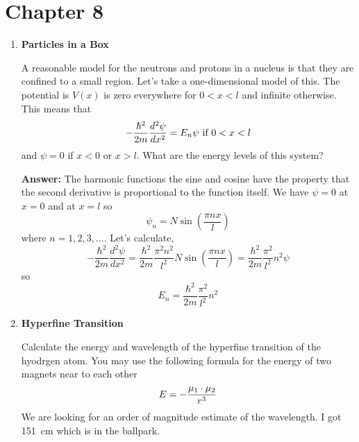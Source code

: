 \documentclass{article}
\newcommand{\rmmat}[1]{\hbox{\rm #1}}
\begin{document}
\fi

\section{Chapter 8}
\begin{enumerate}
\item{\bf Particles in a Box}

A reasonable model for the neutrons and protons in a nucleus is that
they are confined to a small region.   Let's take a one-dimensional
model of this.  The potential is $V(x)$ is zero everywhere for $0<x<l$
and infinite otherwise.  This means that 
\begin{equation}
-\frac{\hbar^2}{2m} \frac{d^2 \psi}{d x^2} = E_n \psi ~\rmmat{if}~0<x<l
\end{equation}
and $\psi=0$ if $x<0$ or $x>l$.  
What are the energy levels of this system?


{\bf Answer:}
The harmonic functions the sine and cosine have the property that the
second derivative is proportional to the function itself.  We have
$\psi=0$ at $x=0$ and at $x=l$ so 
\begin{equation}
\psi_n = N \sin \left ( \frac{\pi n x}{l} \right )
\end{equation}
where $n=1,2,3,\ldots$.  Let's calculate,
\begin{equation}
-\frac{\hbar^2}{2m} \frac{d^2 \psi}{dx^2} = \frac{\hbar^2}{2m}
\frac{\pi^2 n^2}{l^2} N \sin \left ( \frac{\pi n x}{l} \right ) = \frac{\hbar^2}{2m}
\frac{\pi^2}{l^2} n^2 \psi
\end{equation}
so
\begin{equation}
E_n = \frac{\hbar^2}{2m}
\frac{\pi^2}{l^2} n^2
\end{equation}

\item{\bf Hyperfine Transition}

Calculate the energy and wavelength of the hyperfine transition of the
hyodrgen atom.  You may use the following formula for the energy of
two magnets near to each other
\begin{equation}
E = -\frac{{\bf \mu}_1 \cdot {\bf \mu}_2}{r^3}
\end{equation}
We are looking for an order of magnitude estimate of the wavelength.
I got 151~cm which is in the ballpark.


\end{enumerate}
\end{document}
